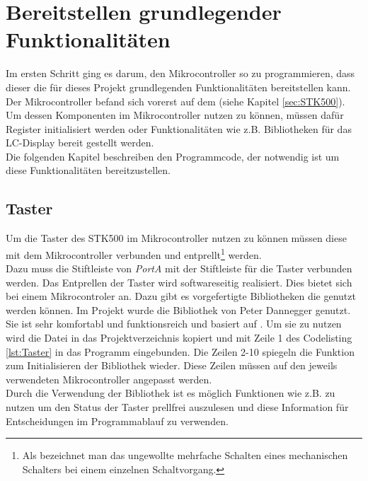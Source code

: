 \section{Bereitstellen grundlegender Funktionalitäten}
\label{sec:Erste_Schritte}
Im ersten Schritt ging es darum, den Mikrocontroller so zu programmieren, dass dieser die für dieses Projekt grundlegenden Funktionalitäten bereitstellen kann.\\
Der Mikrocontroller befand sich vorerst auf dem (siehe Kapitel \ref{sec:STK500}). Um dessen Komponenten im Mikrocontroller nutzen zu können, müssen dafür Register initialisiert werden oder Funktionalitäten wie z.B. Bibliotheken für das LC-Display bereit gestellt werden.\\
Die folgenden Kapitel beschreiben den Programmcode, der notwendig ist um diese Funktionalitäten bereitzustellen.
\subsection{Taster}
\label{sec:Taster}
Um die Taster des STK500 im Mikrocontroller nutzen zu können müssen diese mit dem Mikrocontroller verbunden und entprellt\footnote{Als  bezeichnet man das ungewollte mehrfache Schalten eines mechanischen Schalters bei einem einzelnen Schaltvorgang.} werden.\\
Dazu muss die Stiftleiste von \emph{PortA} mit der Stiftleiste für die Taster verbunden werden. Das Entprellen der Taster wird softwareseitig realisiert. Dies bietet sich bei einem Mikrocontroler an. Dazu gibt es vorgefertigte Bibliotheken die genutzt werden können. Im Projekt wurde die Bibliothek \cite{uC:Dannegger} von Peter Dannegger genutzt. Sie ist sehr komfortabl und funktionsreich und basiert auf . Um sie zu nutzen wird die Datei  in das Projektverzeichnis kopiert und mit Zeile 1 des Codelisting \ref{lst:Taster} in das Programm eingebunden. Die Zeilen 2-10 spiegeln die Funktion zum Initialisieren der Bibliothek wieder. Diese Zeilen müssen auf den jeweils verwendeten Mikrocontroller angepasst werden.\\
Durch die Verwendung der Bibliothek ist es möglich Funktionen wie z.B. \linebreak {} zu nutzen um den Status der Taster prellfrei auszulesen und diese Information für Entscheidungen im Programmablauf zu verwenden. 
\lstset{language=C, basicstyle=\footnotesize, showstringspaces=false, tabsize=8}


